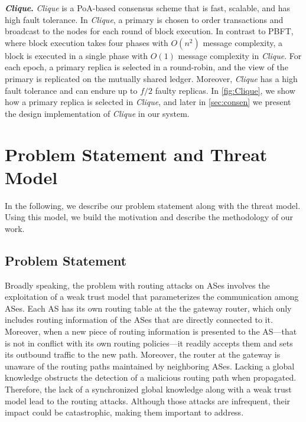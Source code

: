 \documentclass[conference]{IEEEtran}
\newcommand{\BfPara}[1]{{\noindent\bf#1.}\xspace}
\begin{document}
\BfPara{{\em Clique}} \label{sec:cq}
{\em Clique} is a PoA-based consensus scheme that is fast, scalable, and has high fault tolerance. In {\em Clique}, a primary is chosen to order transactions and broadcast to the nodes for each round of block execution. In contrast to PBFT, where block execution takes four phases with $O(n^2)$ message complexity, a block is executed in a single phase with $O(1)$ message complexity in {\em Clique}. For each epoch, a primary replica is selected in a round-robin, and the view of the primary is replicated on the mutually shared ledger. Moreover, {\em Clique} has a high fault tolerance and can endure up to $f/2$ faulty replicas. In \autoref{fig:Clique}, we show how a primary replica is selected in {\em Clique}, and later in \textsection\ref{sec:consen} we present the design implementation of {\em Clique} in our system. 

\section{Problem Statement and Threat Model}\label{sec:ps}
In the following, we describe our problem statement along with the threat model. Using this model, we build the motivation and describe the methodology of our work.

\subsection{Problem Statement} \label{sec:psn}
Broadly speaking, the problem with routing attacks on ASes involves the exploitation of a weak trust model that parameterizes the communication among ASes. Each AS has its own routing table at the the gateway router, which only includes routing information of the ASes that are directly connected to it. Moreover, when a new  piece of routing information is presented to the AS---that is not in conflict with its own routing policies---it readily accepts them and sets its outbound traffic to the new path. Moreover, the router at the gateway is unaware of the routing paths maintained by neighboring ASes. Lacking a global knowledge obstructs the detection of a malicious routing path when propagated. Therefore, the lack of a synchronized global knowledge along with a weak trust model lead to the routing attacks. Although those attacks are infrequent, their impact could be catastrophic, making them important to address. 
\end{document}
